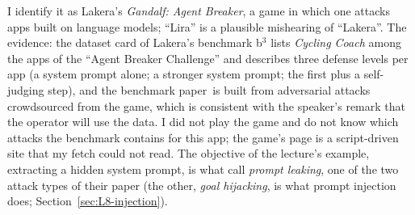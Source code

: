 \begin{beyond}
I identify it as Lakera's \emph{Gandalf: Agent Breaker}, a game in which one attacks apps built on language models; ``Lira'' is a plausible mishearing of ``Lakera''. The evidence: the dataset card of Lakera's benchmark b$^3$ lists \emph{Cycling Coach} among the apps of the ``Agent Breaker Challenge'' and describes three defense levels per app (a system prompt alone; a stronger system prompt; the first plus a self-judging step), and the benchmark paper\,\citep{bazinska2025} is built from adversarial attacks crowdsourced from the game, which is consistent with the speaker's remark that the operator will use the data. I did not play the game and do not know which attacks the benchmark contains for this app; the game's page is a script-driven site that my fetch could not read. The objective of the lecture's example, extracting a hidden system prompt, is what \citet{perez2022} call \emph{prompt leaking}, one of the two attack types of their paper (the other, \emph{goal hijacking}, is what prompt injection does; Section~\ref{sec:L8-injection}).
\end{beyond}


